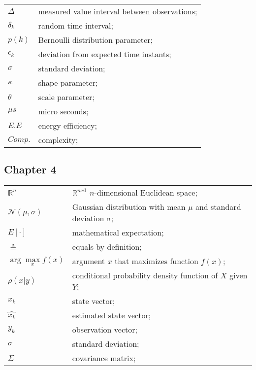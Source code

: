 \begin{longtable}{ll}
	$\Delta$				& measured value interval between observations; \\
	$\delta_k$				& random time interval; \\
	
	$p(k)$					& Bernoulli distribution parameter; \\
	$\epsilon_k$			& deviation from expected time instants; \\
	$\sigma$				& standard deviation; \\
	$\kappa$				& shape parameter; \\
	$\theta$				& scale parameter; \\
	
	$\mu s$					& micro seconds; \\
	$E.E$					& energy efficiency; \\
	$Comp.$					& complexity; \\

\end{longtable}


\subsection*{Chapter 4}

\begin{longtable}{ll}
	$\mathbb{R}^n$			& $\mathbb{R}^{nx1}$ $n$-dimensional Euclidean space; \\
	
	$\mathcal{N}(\mu,\sigma)$ & Gaussian distribution with mean $\mu$ and standard deviation $\sigma$; \\
	$E[\mathord{\cdot}]$	& mathematical expectation; \\
	$\triangleq$			& equals by definition; \\	
	$\operatorname{arg}  
	\underset{x}
	{\operatorname{max}} 
					f(x)$	& argument $x$ that maximizes function $f(x)$; \\ 
					
	$\rho(x|y)$				& conditional probability density function of $X$ given $Y$; \\
	$x_k$					& state vector; \\
	$\hat{x_k}$				& estimated state vector; \\
	$y_k$					& observation vector; \\
	
%
	$\sigma$				& standard deviation; \\
	$\Sigma$				& covariance matrix; \\
	
	
\end{longtable}



